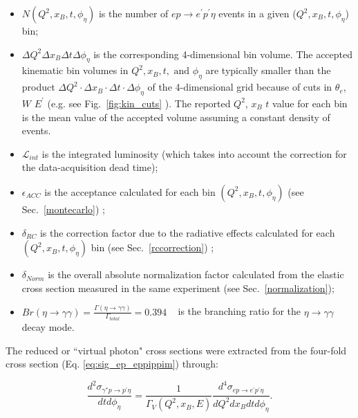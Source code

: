 \documentclass[prc,aps,floatfix,showpacs,showkeys,twocolumn,superscriptaddress,letterpaper,10pt]{revtex4-1}
\begin{document}
\begin{itemize}

\item $N(Q^2,x_B,t,\phi_\eta)$ is the  number of $ep \rightarrow e^\prime p^\prime \eta$ events in a given ($Q^2,x_B,t,\phi_\eta$) bin;

\item $\Delta Q^2 \Delta x_B \Delta t \Delta \phi_\eta$ is the corresponding 4-dimensional bin volume. 
The accepted kinematic bin volumes in   $Q^2,   x_B,  t,  {\text{ and }}  \phi_\eta$ are typically smaller than 
the product %
$\Delta Q^2 \cdot \Delta x_B \cdot \Delta t \cdot \Delta\phi_\eta$ of the 4-dimensional grid 
because of cuts in $\theta_e$, $W$  $E^\prime$ (e.g. see Fig.~\ref{fig:kin_cuts} ). 
The reported $Q^2$, $x_B$  $t$  value for each bin is the mean value of the accepted volume assuming a constant density of events.  


\item $\mathcal{L}_{int}$ is the integrated luminosity (which takes
into account the correction for the data-acquisition dead time);
 
\item $\epsilon_{ACC}$ is the acceptance calculated for each bin $(Q^2,x_B,t,\phi_\eta)$
(see Sec.~\ref{montecarlo})
;

\item $\delta_{RC}$ is the correction factor due to the radiative effects calculated for each $(Q^2,x_B,t,\phi_\eta)$ bin
(see Sec.~\ref{rccorrection})
;

\item $\delta_{Norm}$ is the overall absolute normalization factor calculated from the elastic cross section measured in the same experiment 
(see  Sec.~\ref{normalization});
 
\item $Br(\eta\to\gamma\gamma)=\frac  {\Gamma(\eta\to\gamma\gamma) }   {\Gamma_{total}}=0.394$ 
~\cite{Agashe:2014kda} 
is the branching ratio for the $\eta \to \gamma\gamma$ decay mode.

\end{itemize}

The reduced or ``virtual photon"  cross sections  were extracted from the four-fold cross section (Eq. \ref{eq:sig_ep_eppippim}) through:


\begin{equation}
\frac{d^2\sigma_{\gamma^* p \rightarrow p^\prime \eta} }{dt d\phi_\eta} = 
\frac{1}{\Gamma_V(Q^2,x_B,E)} 
\frac{d^4\sigma_{ep\rightarrow e^\prime p^\prime \eta}}{dQ^2 dx_B dt d\phi_\eta}.
\end{equation}
\end{document}
